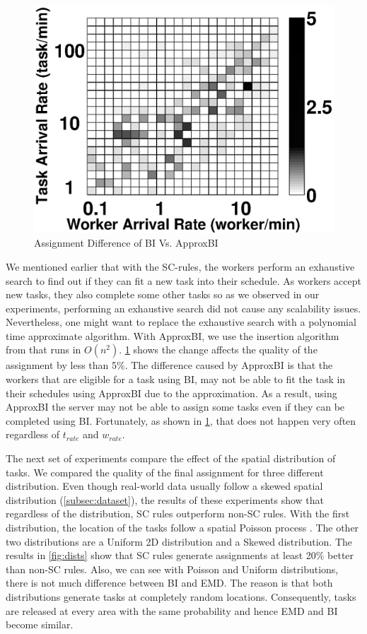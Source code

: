\begin{figure}[h]
	\centering
	\includegraphics[width = 0.65\columnwidth]{figures/bi_abi.eps}
	\vspace{-0.1in}
	\caption{Assignment Difference of BI Vs. ApproxBI}\label{fig:bi_abi}
\end{figure}

We mentioned earlier that with the SC-rules, the workers perform an exhaustive search to find out if they can fit a new task into their schedule. As workers accept new tasks, they also complete some other tasks so as we observed in our experiments, performing an exhaustive search did not cause any scalability issues. Nevertheless, one might want to replace the exhaustive search with a polynomial time approximate algorithm. With ApproxBI, we use the insertion algorithm from \cite{Rosenkrantz74} that runs in $O(n^2)$. \cref{fig:bi_abi} shows the change affects the quality of the assignment by less than 5\%. The difference caused by ApproxBI is that the workers that are eligible for a task using BI, may not be able to fit the task in their schedules using ApproxBI due to the approximation. As a result, using ApproxBI the server may not be able to assign some tasks even if they can be completed using BI. Fortunately, as shown in \cref{fig:bi_abi}, that does not happen very often regardless of $t_{rate}$ and $w_{rate}$.

The next set of experiments compare the effect of the spatial distribution of tasks. We compared the quality of the final assignment for three different distribution. Even though real-world data usually follow a skewed spatial distribution (\cref{subsec:dataset}), the results of these experiments show that regardless of the distribution, SC rules outperform non-SC rules. With the first distribution, the location of the tasks follow a spatial Poisson process \cite{Baddeley07}. The other two distributions are a Uniform 2D distribution and a Skewed distribution. The results in \cref{fig:dists} show that SC rules generate assignments at least 20\% better than non-SC rules. Also, we can see with Poisson and Uniform distributions, there is not much difference between BI and EMD. The reason is that both distributions generate tasks at completely random locations. Consequently, tasks are released at every area with the same probability and hence EMD and BI become similar.


